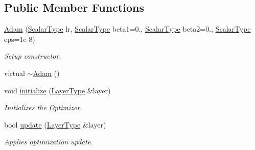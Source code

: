\subsection*{Public Member Functions}
\begin{DoxyCompactItemize}
\item 
\hyperlink{classffnn_1_1optimizer_1_1_adam_3_01layer_1_1_sparsely_connected_3_01_value_type_00_01_inputs_at5101e46d32858ec2169acdeede08d723_a58cbea05b475e4cf96e1ed481e5755ef}{Adam} (\hyperlink{classffnn_1_1optimizer_1_1_adam_3_01layer_1_1_sparsely_connected_3_01_value_type_00_01_inputs_at5101e46d32858ec2169acdeede08d723_acbcaaadfd5e5ad46a775e89024f96ec5}{Scalar\-Type} lr, \hyperlink{classffnn_1_1optimizer_1_1_adam_3_01layer_1_1_sparsely_connected_3_01_value_type_00_01_inputs_at5101e46d32858ec2169acdeede08d723_acbcaaadfd5e5ad46a775e89024f96ec5}{Scalar\-Type} beta1=0., \hyperlink{classffnn_1_1optimizer_1_1_adam_3_01layer_1_1_sparsely_connected_3_01_value_type_00_01_inputs_at5101e46d32858ec2169acdeede08d723_acbcaaadfd5e5ad46a775e89024f96ec5}{Scalar\-Type} beta2=0., \hyperlink{classffnn_1_1optimizer_1_1_adam_3_01layer_1_1_sparsely_connected_3_01_value_type_00_01_inputs_at5101e46d32858ec2169acdeede08d723_acbcaaadfd5e5ad46a775e89024f96ec5}{Scalar\-Type} eps=1e-\/8)
\begin{DoxyCompactList}\small\item\em Setup constructor. \end{DoxyCompactList}\item 
virtual \hyperlink{classffnn_1_1optimizer_1_1_adam_3_01layer_1_1_sparsely_connected_3_01_value_type_00_01_inputs_at5101e46d32858ec2169acdeede08d723_a131e9e3dfb840c43f20c661681e92dc1}{$\sim$\-Adam} ()
\item 
void \hyperlink{classffnn_1_1optimizer_1_1_adam_3_01layer_1_1_sparsely_connected_3_01_value_type_00_01_inputs_at5101e46d32858ec2169acdeede08d723_a3529c6f6fb1befc882cc3ae17c00ba5a}{initialize} (\hyperlink{classffnn_1_1optimizer_1_1_adam_3_01layer_1_1_sparsely_connected_3_01_value_type_00_01_inputs_at5101e46d32858ec2169acdeede08d723_af2f04c26de6845836cd595df5caaeaf9}{Layer\-Type} \&layer)
\begin{DoxyCompactList}\small\item\em Initializes the \hyperlink{classffnn_1_1optimizer_1_1_optimizer}{Optimizer}. \end{DoxyCompactList}\item 
bool \hyperlink{classffnn_1_1optimizer_1_1_adam_3_01layer_1_1_sparsely_connected_3_01_value_type_00_01_inputs_at5101e46d32858ec2169acdeede08d723_aaa3b2eb55a9d80d51330c132df65214b}{update} (\hyperlink{classffnn_1_1optimizer_1_1_adam_3_01layer_1_1_sparsely_connected_3_01_value_type_00_01_inputs_at5101e46d32858ec2169acdeede08d723_af2f04c26de6845836cd595df5caaeaf9}{Layer\-Type} \&layer)
\begin{DoxyCompactList}\small\item\em Applies optimization update. \end{DoxyCompactList}\end{DoxyCompactItemize}
